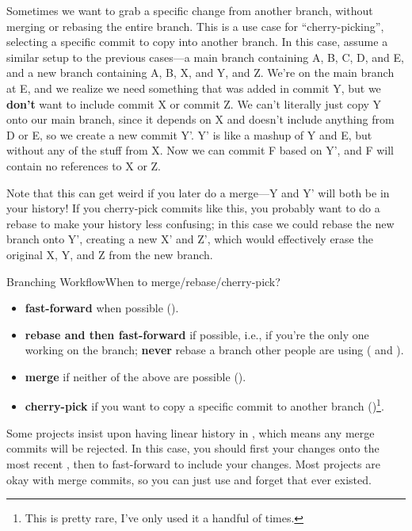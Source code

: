 Sometimes we want to grab a specific change from another branch, without
merging or rebasing the entire branch.  This is a use case for
\enquote{cherry-picking}, selecting a specific commit to copy into another
branch.  In this case, assume a similar setup to the previous cases---a main
branch containing A, B, C, D, and E, and a new branch containing A, B, X, and
Y, and Z.  We're on the main branch at E, and we realize we need something that
was added in commit Y, but we \textbf{don't} want to include commit X or commit
Z.  We can't literally just copy Y onto our main branch, since it depends on X
and doesn't include anything from D or E, so we create a new commit Y'.  Y' is
like a mashup of Y and E, but without any of the stuff from X.  Now we can
commit F based on Y', and F will contain no references to X or Z.

Note that this can get weird if you later do a merge---Y and Y' will both be in
your history!  If you cherry-pick commits like this, you probably want to do a
rebase to make your history less confusing; in this case we could rebase the
new branch onto Y', creating a new X' and Z', which would effectively erase the original X, Y, and Z from the new branch.

\begin{frame}{Branching Workflow}{When to merge/rebase/cherry-pick?}
  \begin{itemize}
    \item \textbf{fast-forward} when possible ().
    \item \textbf{rebase and then fast-forward} if possible, i.e., if you're
      the only one working on the branch; \textbf{never} rebase a branch other
      people are using ( and ).
    \item \textbf{merge} if neither of the above are possible ().
    \item \textbf{cherry-pick} if you want to copy a specific commit to another
      branch ()\footnote{This is pretty rare, I've only
      used it a handful of times.}.
  \end{itemize}
\end{frame}

Some projects insist upon having linear history in , which means any
merge commits will be rejected.  In this case, you should first 
your changes onto the most recent , then  to
fast-forward  to include your changes.  Most projects are okay with
merge commits, so you can just use  and forget that 
ever existed.

